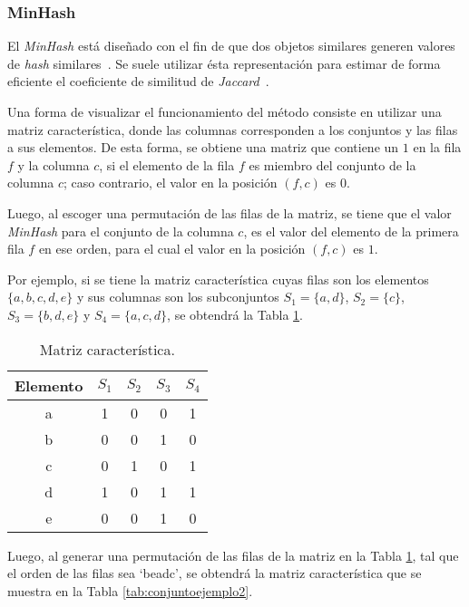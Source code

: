 \subsubsection{MinHash}

El \textit{MinHash} está diseñado con el fin de que dos objetos
similares generen valores de \textit{hash} similares~\cite{grattan_2017}.
Se suele utilizar ésta representación para estimar de forma eficiente
el coeficiente de similitud de \textit{Jaccard}~\cite{Rajaraman:2011:MMD:2124405}.

Una forma de visualizar el funcionamiento del método
consiste en utilizar una matriz característica,
donde las columnas corresponden a los conjuntos y
las filas a sus elementos.
De esta forma, se obtiene una matriz que contiene un $1$ en la fila $f$ y la columna $c$,
si el elemento de la fila $f$ es miembro del conjunto de la columna $c$;
caso contrario, el valor en la posición $(f,c)$ es $0$.

Luego, al escoger una permutación de las filas de la matriz, 
se tiene que el valor \textit{MinHash} para el conjunto de la columna $c$,
es el valor del elemento de la primera fila $f$ en ese orden,
para el cual el valor en la posición $(f,c)$ es $1$.

Por ejemplo, si se tiene la matriz característica cuyas filas son los elementos
$\{a,b,c,d,e\}$ y sus columnas son los subconjuntos $S_1 = \{a,d\}$,
$S_2 = \{c\}$, $S_3 = \{b,d,e\}$ y $S_4 = \{a,c,d\}$, se obtendrá la Tabla \ref{tab:conjuntoejemplo1}.

\begin{table}[h]
\caption{Matriz característica.}
\label{tab:conjuntoejemplo1}
\small
\centering
\begin{tabular}{ccccc}
\hline
{Elemento} & {$S_1$} & {$S_2$} & {$S_3$} & {$S_4$} \\
\hline
a & 1 & 0 & 0 & 1 \\
b & 0 & 0 & 1 & 0 \\
c & 0 & 1 & 0 & 1 \\
d & 1 & 0 & 1 & 1 \\
e & 0 & 0 & 1 & 0 \\
\hline
\end{tabular}
\end{table}

Luego, al generar una permutación de las filas de la matriz en la Tabla \ref{tab:conjuntoejemplo1},
tal que el orden de las filas sea ‘beadc’, se obtendrá la matriz característica
que se muestra en la Tabla \ref{tab:conjuntoejemplo2}.

